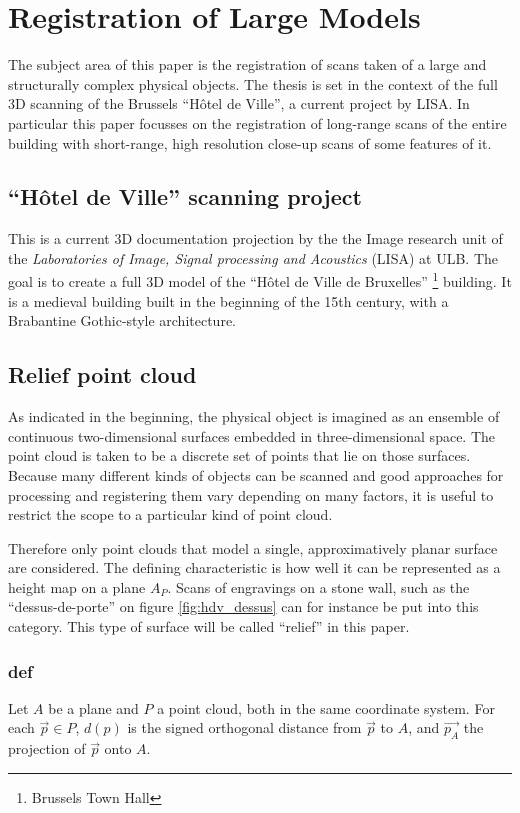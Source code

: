 \chapter{Registration of Large Models} \label{ch:large_model}
The subject area of this paper is the registration of scans taken of a large and structurally complex physical objects. The thesis is set in the context of the full 3D scanning of the Brussels ``Hôtel de Ville'', a current project by LISA. In particular this paper focusses on the registration of long-range scans of the entire building with short-range, high resolution close-up scans of some features of it.


\section{``Hôtel de Ville'' scanning project}
This is a current 3D documentation projection by the the Image research unit of the \emph{Laboratories of Image, Signal processing and Acoustics} (LISA) at ULB. The goal is to create a full 3D model of the ``Hôtel de Ville de Bruxelles'' \footnote{Brussels Town Hall} building. It is a medieval building built in the beginning of the 15th century, with a Brabantine Gothic-style architecture.


\section{Relief point cloud}
As indicated in the beginning, the physical object is imagined as an ensemble of continuous two-dimensional surfaces embedded in three-dimensional space. The point cloud is taken to be a discrete set of points that lie on those surfaces. Because many different kinds of objects can be scanned and good approaches for processing and registering them vary depending on many factors, it is useful to restrict the scope to a particular kind of point cloud.

Therefore only point clouds that model a single, approximatively planar surface are considered. The defining characteristic is how well it can be represented as a height map on a plane $A_P$. Scans of engravings on a stone wall, such as the ``dessus-de-porte'' on figure \ref{fig:hdv_dessus} can for instance be put into this category. This type of surface will be called ``relief'' in this paper.

\subsection{def}
Let $A$ be a plane and $P$ a point cloud, both in the same coordinate system. For each $\vec{p} \in P$, $d(p)$ is the signed orthogonal distance from $\vec{p}$ to $A$, and $\vec{p_A}$ the projection of $\vec{p}$ onto $A$.


